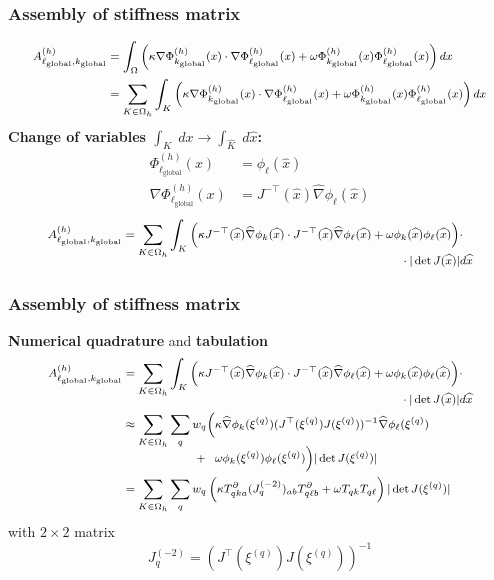 \documentclass{beamer}
\begin{document}
\begin{frame}
  \frametitle{Assembly of stiffness matrix}
  $$
  {\footnotesize
\begin{aligned}
A^{(h)}_{\ell_{\text{global}},k_{\text{global}}} &= \int_\Omega \left(\kappa \nabla \Phi^{(h)}_{k_{\text{global}}}(x) \cdot\nabla\Phi^{(h)}_{\ell_{\text{global}}}(x)+\omega \Phi^{(h)}_{k_{\text{global}}}(x)\Phi^{(h)}_{\ell_{\text{global}}}(x)\right)dx\\
&= \sum_{K\in\Omega_h}\int_K \left(\kappa \nabla \Phi^{(h)}_{k_{\text{global}}}(x) \cdot\nabla\Phi^{(h)}_{\ell_{\text{global}}}(x)+\omega \Phi^{(h)}_{k_{\text{global}}}(x)\Phi^{(h)}_{\ell_{\text{global}}}(x)\right)dx
\end{aligned}}
$$
\textbf{Change of variables $\int_{K}\;dx\rightarrow\int_{\widehat{K}}\;d\widehat{x}$:} 
$$
\begin{aligned}
\Phi^{(h)}_{\ell_{\text{global}}}(x) &= \phi_\ell(\widehat{x})\\
\nabla \Phi^{(h)}_{\ell_{\text{global}}}(x) &= J^{-\top}(\widehat{x}) \widehat{\nabla}\phi_\ell(\widehat{x})
\end{aligned}
$$
$$
{\footnotesize
\begin{aligned}
A^{(h)}_{\ell_{\text{global}},k_{\text{global}}} &= \sum_{K\in \Omega_h}\int_K \Big(\kappa J^{-\top}(\widehat{x}) \widehat{\nabla} \phi_k (\widehat{x})\cdot J^{-\top}(\widehat{x})\widehat{\nabla}\phi_\ell(\widehat{x})+ \omega\phi_k(\widehat{x})\phi_\ell(\widehat{x})\Big)\cdot\\[-2ex]
&\hspace{7cm}\cdot|\det{J}(\widehat{x})|d\widehat{x}
\end{aligned}}
$$
\end{frame}


\begin{frame}
  \frametitle{Assembly of stiffness matrix}
  \textbf{Numerical quadrature} and \textbf{tabulation}
  $$
  {\footnotesize
\begin{aligned}
A^{(h)}_{\ell_{\text{global}},k_{\text{global}}} &= \sum_{K\in \Omega_h}\int_K \Big(\kappa J^{-\top}(\widehat{x}) \widehat{\nabla} \phi_k (\widehat{x})\cdot J^{-\top}(\widehat{x})\widehat{\nabla}\phi_\ell(\widehat{x})+ \omega\phi_k(\widehat{x})\phi_\ell(\widehat{x})\Big)\cdot\\[-2ex]
&\hspace{7cm}\cdot|\det{J}(\widehat{x})|d\widehat{x}
\\
&\approx \sum_{K\in \Omega_h}\sum_q  w_q \Big(\kappa \widehat{\nabla} \phi_k(\xi^{(q)})(J^{\top}(\xi^{(q)}) J(\xi^{(q)}))^{-1}\widehat{\nabla}\phi_\ell(\xi^{(q)})\\[-1.5ex]
&\qquad\qquad\qquad+\;\; \omega\phi_k(\xi^{(q)})\phi_\ell(\xi^{(q)})\Big)|\det{J}(\xi^{(q)})| \\
&= \sum_{K\in \Omega_h} \sum_q w_q  \left(\kappa T^\partial_{qka}(J^{(-2)}_q)_{ab} T^\partial_{q\ell b} +\omega T_{qk}T_{q\ell}\right)|\det{J}(\xi^{(q)})|
\end{aligned}}
$$
with $2\times 2$ matrix
$$
J^{(-2)}_{q} =  \left(J^{\top}(\xi^{(q)}) J(\xi^{(q)})\right)^{-1}
$$
\end{frame}
\end{document}
